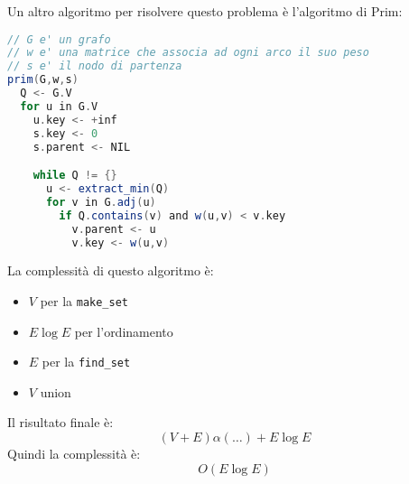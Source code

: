 \documentclass[a4paper]{article}
\begin{document}
\vspace{1em}
\noindent
Un altro algoritmo per risolvere questo problema è l'algoritmo di Prim:
\begin{lstlisting}[language=Scala]
// G e' un grafo
// w e' una matrice che associa ad ogni arco il suo peso
// s e' il nodo di partenza
prim(G,w,s)
  Q <- G.V
  for u in G.V
    u.key <- +inf
    s.key <- 0
    s.parent <- NIL

    while Q != {}
      u <- extract_min(Q)
      for v in G.adj(u)
        if Q.contains(v) and w(u,v) < v.key
          v.parent <- u
          v.key <- w(u,v)
\end{lstlisting}
La complessità di questo algoritmo è:
\begin{itemize}
  \item \( V \) per la \texttt{make\_set}
  \item \( E \log E \) per l'ordinamento
  \item \( E \) per la \texttt{find\_set}
  \item \( V \) union
\end{itemize}
Il risultato finale è:
\[
  (V+E) \alpha(\ldots) + E \log E
\] 
Quindi la complessità è:
\[
  O(E \log E)
\]
\end{document}
